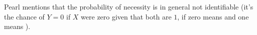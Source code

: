 Pearl mentions that the probability of necessity is in general not identifiable (it's the chance of $Y=0$ if $X$ were zero given that both are $1$, if zero means  and one means ).


